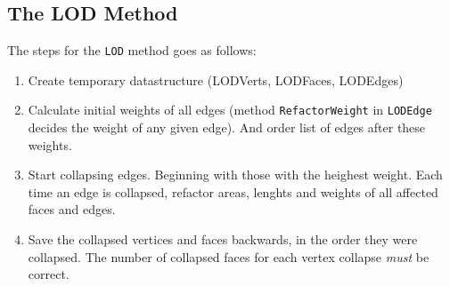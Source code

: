 \subsection*{The LOD Method}
The steps for the \texttt{LOD} method goes as follows:
\begin{enumerate}
\item Create temporary datastructure (LODVerts, LODFaces, LODEdges)
\item Calculate initial weights of all edges (method \texttt{RefactorWeight} in \texttt{LODEdge} decides the weight of any given edge). And order list of edges after these weights.
\item Start collapsing edges. Beginning with those with the heighest weight. Each time an edge is collapsed, refactor areas, lenghts and weights of all affected faces and edges.
\item Save the collapsed vertices and faces backwards, in the order they were collapsed. The number of collapsed faces for each vertex collapse \emph{must} be correct.
\end{enumerate}


